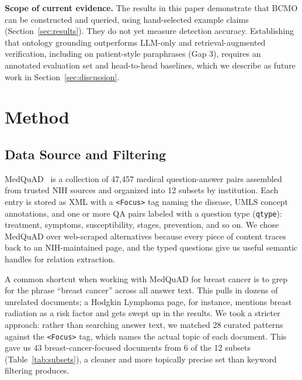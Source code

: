 \documentclass[10pt,a4paper]{article}
\begin{document}
\textbf{Scope of current evidence.} The results in this paper demonstrate that BCMO can be constructed and queried, using hand-selected example claims (Section~\ref{sec:results}). They do not yet measure detection accuracy. Establishing that ontology grounding outperforms LLM-only and retrieval-augmented verification, including on patient-style paraphrases (Gap 3), requires an annotated evaluation set and head-to-head baselines, which we describe as future work in Section~\ref{sec:discussion}.

\section{Method}
\label{sec:method}

\subsection{Data Source and Filtering}

MedQuAD~\cite{benabacha2019} is a collection of 47,457 medical question-answer pairs assembled from trusted NIH sources and organized into 12 subsets by institution. Each entry is stored as XML with a \texttt{<Focus>} tag naming the disease, UMLS concept annotations, and one or more QA pairs labeled with a question type (\texttt{qtype}): treatment, symptoms, susceptibility, stages, prevention, and so on. We chose MedQuAD over web-scraped alternatives because every piece of content traces back to an NIH-maintained page, and the typed questions give us useful semantic handles for relation extraction.

A common shortcut when working with MedQuAD for breast cancer is to grep for the phrase ``breast cancer'' across all answer text. This pulls in dozens of unrelated documents; a Hodgkin Lymphoma page, for instance, mentions breast radiation as a risk factor and gets swept up in the results. We took a stricter approach: rather than searching answer text, we matched 28 curated patterns against the \texttt{<Focus>} tag, which names the actual topic of each document. This gave us 43 breast-cancer-focused documents from 6 of the 12 subsets (Table~\ref{tab:subsets}), a cleaner and more topically precise set than keyword filtering produces.
\end{document}
